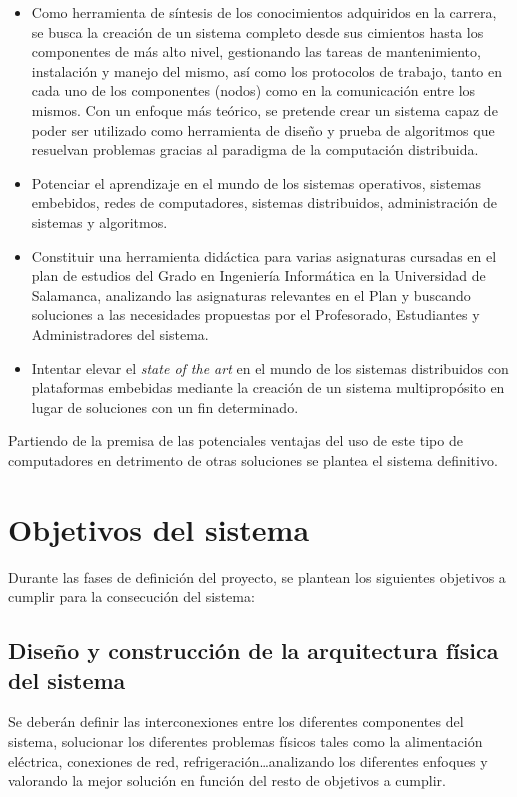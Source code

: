 \begin{itemize}
	\item Como herramienta de síntesis de los conocimientos adquiridos en la carrera, se busca la creación de un sistema completo desde sus cimientos hasta los componentes de más alto nivel, gestionando las tareas de mantenimiento, instalación y manejo del mismo, así como los protocolos de trabajo, tanto en cada uno de los componentes (nodos) como en la comunicación entre los mismos. Con un enfoque más teórico, se pretende crear un sistema capaz de poder ser utilizado como herramienta de diseño y prueba de algoritmos que resuelvan problemas gracias al paradigma de la computación distribuida.
	\item Potenciar el aprendizaje en el mundo de los sistemas operativos, sistemas embebidos, redes de computadores, sistemas distribuidos, administración de sistemas y algoritmos.
	\item Constituir una herramienta didáctica para varias asignaturas cursadas en el plan de estudios del Grado en Ingeniería Informática en la Universidad de Salamanca, analizando las asignaturas relevantes en el Plan y buscando soluciones a las necesidades propuestas por el Profesorado, Estudiantes y Administradores del sistema.
	\item Intentar elevar el \textit{state of the art} en el mundo de los sistemas distribuidos con plataformas embebidas mediante la creación de un sistema multipropósito en lugar de soluciones con un fin determinado.
\end{itemize}

Partiendo de la premisa de las potenciales ventajas del uso de este tipo de computadores en detrimento de otras soluciones se plantea el sistema definitivo.

\section{Objetivos del sistema}

Durante las fases de definición del proyecto, se plantean los siguientes objetivos a cumplir para la consecución del sistema:

\subsection{Diseño y construcción de la arquitectura física del sistema}
Se deberán definir las interconexiones entre los diferentes componentes del sistema, solucionar los diferentes problemas físicos tales como la alimentación eléctrica, conexiones de red, refrigeración\dots analizando los diferentes enfoques y valorando la mejor solución en función del resto de objetivos a cumplir.

